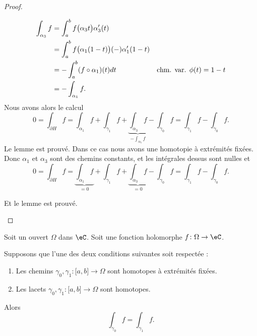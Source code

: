 \begin{proof}
\begin{subproof}
\begin{subproof}
\begin{subequations}
				\begin{align}
					\int_{\alpha_3}f & =\int_a^bf\big( \alpha_3t \big)\alpha_3'(t)                                              \\
					                 & =\int_a^bf\big( \alpha_1(1-t) \big)(-)\alpha_1'(1-t)                                     \\
					                 & =-\int_a^b(f\circ\alpha_1)(t)dt                      & \text{chm. var. \( \phi(t)=1-t\)} \\
					                 & =-\int_{\alpha_1}f.
				\end{align}
			\end{subequations}
			Nous avons alors le calcul
			\begin{equation}
				0=\int_{\partial H}f=\int_{\alpha_1}f+\int_{\gamma_1}f+\underbrace{\int_{\alpha_3}f}_{-\int_{\alpha_1}f}-\int_{\gamma_0}f=\int_{\gamma_1}f-\int_{\gamma_0}f.
			\end{equation}
			Le lemme est prouvé.
			Dans ce cas nous avons une homotopie à extrémités fixées. Donc \( \alpha_1\) et \( \alpha_3\) sont des chemins constants, et les intégrales dessus sont nulles et
			\begin{equation}
				0=\int_{\partial H}f=\underbrace{\int_{\alpha_1}f}_{=0}+\int_{\gamma_1}f+\underbrace{\int_{\alpha_3}f}_{=0}-\int_{\gamma_0}f=\int_{\gamma_1}f-\int_{\gamma_0}f.
			\end{equation}
		\end{subproof}
		Et le lemme est prouvé.
	\end{subproof}
\end{proof}


\begin{theorem}     \label{THOooVTFXooBgvVyD}
	Soit un ouvert \( \Omega\) dans \( \eC\). Soit une fonction holomorphe \( f\colon \Omega\to \eC\).

	Supposons que l'une des deux conditions suivantes soit respectée :
	\begin{enumerate}
		\item
		      Les chemins \( \gamma_0,\gamma_1\colon \mathopen[ a , b \mathclose]\to \Omega \) sont homotopes à extrémités fixées.
		\item       \label{ITEMooESDVooFgVarr}
		      Les lacets \( \gamma_0,\gamma_1\colon \mathopen[ a , b \mathclose]\to \Omega \) sont homotopes.
	\end{enumerate}
	Alors
	\begin{equation}
		\int_{\gamma_0}f=\int_{\gamma_1}f.
	\end{equation}
\end{theorem}

